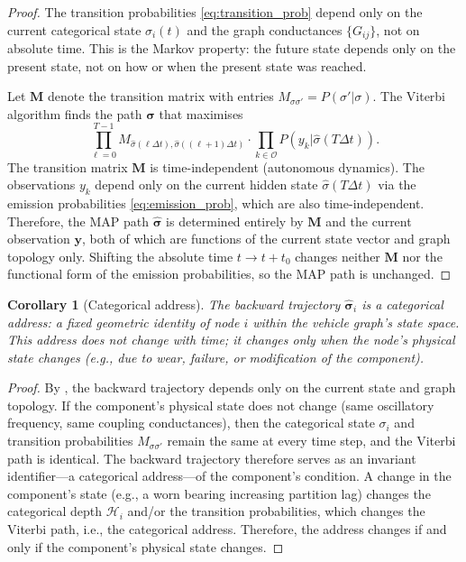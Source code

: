 \documentclass[twocolumn,10pt,a4paper]{article}
\newtheorem{corollary}[theorem]{Corollary}
\theoremstyle{definition}
\theoremstyle{remark}
\newcommand{\vect}[1]{\boldsymbol{#1}}
\newcommand{\mat}[1]{\mathbf{#1}}
\begin{document}
\begin{proof}
The transition probabilities \eqref{eq:transition_prob} depend only on the current categorical state $\sigma_i(t)$ and the graph conductances $\{G_{ij}\}$, not on absolute time. This is the Markov property: the future state depends only on the present state, not on how or when the present state was reached.

Let $\mat{M}$ denote the transition matrix with entries $M_{\sigma\sigma'} = P(\sigma' | \sigma)$. The Viterbi algorithm finds the path $\hat{\vect{\sigma}}$ that maximises
\begin{equation}
\prod_{\ell=0}^{T-1} M_{\hat{\sigma}(\ell\Delta t), \hat{\sigma}((\ell+1)\Delta t)} \cdot \prod_{k \in \mathcal{O}} P(y_k | \hat{\sigma}(T\Delta t)).
\end{equation}
The transition matrix $\mat{M}$ is time-independent (autonomous dynamics). The observations $y_k$ depend only on the current hidden state $\hat{\sigma}(T\Delta t)$ via the emission probabilities \eqref{eq:emission_prob}, which are also time-independent. Therefore, the MAP path $\hat{\vect{\sigma}}$ is determined entirely by $\mat{M}$ and the current observation $\vect{y}$, both of which are functions of the current state vector and graph topology only. Shifting the absolute time $t \to t + t_0$ changes neither $\mat{M}$ nor the functional form of the emission probabilities, so the MAP path is unchanged.
\end{proof}

\begin{corollary}[Categorical address]\label{cor:categorical_address}
The backward trajectory $\hat{\vect{\sigma}}_i$ is a \emph{categorical address}: a fixed geometric identity of node $i$ within the vehicle graph's state space. This address does not change with time; it changes only when the node's physical state changes (e.g., due to wear, failure, or modification of the component).
\end{corollary}

\begin{proof}
By , the backward trajectory depends only on the current state and graph topology. If the component's physical state does not change (same oscillatory frequency, same coupling conductances), then the categorical state $\sigma_i$ and transition probabilities $M_{\sigma\sigma'}$ remain the same at every time step, and the Viterbi path is identical. The backward trajectory therefore serves as an invariant identifier---a categorical address---of the component's condition. A change in the component's state (e.g., a worn bearing increasing partition lag) changes the categorical depth $\mathcal{H}_i$ and/or the transition probabilities, which changes the Viterbi path, i.e., the categorical address. Therefore, the address changes if and only if the component's physical state changes.
\end{proof}
\end{document}
